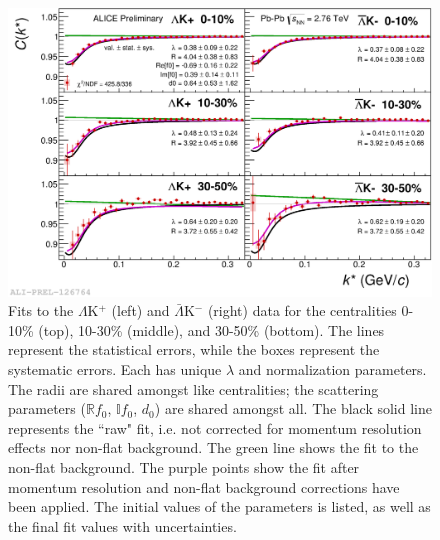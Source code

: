 \documentclass[../AnalysisNoteJBuxton.tex]{subfiles}
\begin{document}
\begin{figure}[h]
  \centering
  \includegraphics[width=\textwidth]{7_ResultsAndDiscussion/Figures/2017-Feb-04-canKStarCfwFitsLamKchPwConj_0010_1030_3050_MomResCrctn_NonFlatBgdCrctn.png}
  \caption[$\Lambda$K$^{+}$($\bar{\Lambda}$K$^{-}$) Fits, with NO residual correlations included, with No Residuals]{Fits to the $\Lambda$K$^{+}$ (left) and $\bar{\Lambda}$K$^{-}$ (right) data for the centralities 0-10\% (top), 10-30\% (middle), and 30-50\% (bottom).
The lines represent the statistical errors, while the boxes represent the systematic errors.  
Each has unique $\lambda$ and normalization parameters.
The radii are shared amongst like centralities; the scattering parameters ($\mathbb{R}f_{0}$, $\mathbb{I}f_{0}$, $d_{0}$) are shared amongst all.
The black solid line represents the ``raw" fit, i.e. not corrected for momentum resolution effects nor non-flat background.  
The green line shows the fit to the non-flat background.
The purple points show the fit after momentum resolution and non-flat background corrections have been applied.
The initial values of the parameters is listed, as well as the final fit values with uncertainties.}
  \label{fig:LamKchPwConjFits_NoRes}
\end{figure}
\end{document}
